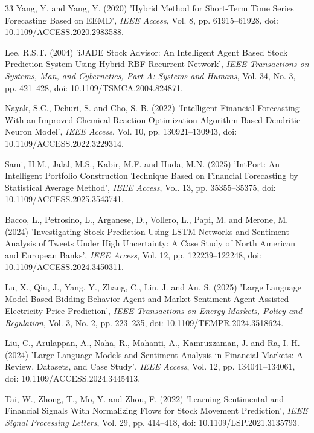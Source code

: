 \documentclass{singlecol-new}
\theoremstyle{TH}{
\newtheorem{lemma}{Lemma}
\newtheorem{theorem}[lemma]{Theorem}
\newtheorem{corrolary}[lemma]{Corrolary}
\newtheorem{conjecture}[lemma]{Conjecture}
\newtheorem{proposition}[lemma]{Proposition}
\newtheorem{claim}[lemma]{Claim}
\newtheorem{stheorem}[lemma]{Wrong Theorem}
\newtheorem{algorithm}{Algorithm}
}
\theoremstyle{THrm}{
\newtheorem{definition}{Definition}[section]
\newtheorem{question}{Question}[section]
\newtheorem{remark}{Remark}
\newtheorem{scheme}{Scheme}
}
\theoremstyle{THhit}{
\newtheorem{case}{Case}[section]
}
\begin{document}
\begin{thebibliography}{33}
Yang, Y. and Yang, Y. (2020) 'Hybrid Method for Short-Term Time Series Forecasting Based on EEMD', {\it IEEE Access}, Vol. 8, pp. 61915--61928, doi: 10.1109/ACCESS.2020.2983588.

Lee, R.S.T. (2004) 'iJADE Stock Advisor: An Intelligent Agent Based Stock Prediction System Using Hybrid RBF Recurrent Network', {\it IEEE Transactions on Systems, Man, and Cybernetics, Part A: Systems and Humans}, Vol. 34, No. 3, pp. 421--428, doi: 10.1109/TSMCA.2004.824871.

Nayak, S.C., Dehuri, S. and Cho, S.-B. (2022) 'Intelligent Financial Forecasting With an Improved Chemical Reaction Optimization Algorithm Based Dendritic Neuron Model', {\it IEEE Access}, Vol. 10, pp. 130921--130943, doi: 10.1109/ACCESS.2022.3229314.

Sami, H.M., Jalal, M.S., Kabir, M.F. and Huda, M.N. (2025) 'IntPort: An Intelligent Portfolio Construction Technique Based on Financial Forecasting by Statistical Average Method', {\it IEEE Access}, Vol. 13, pp. 35355--35375, doi: 10.1109/ACCESS.2025.3543741.

Bacco, L., Petrosino, L., Arganese, D., Vollero, L., Papi, M. and Merone, M. (2024) 'Investigating Stock Prediction Using LSTM Networks and Sentiment Analysis of Tweets Under High Uncertainty: A Case Study of North American and European Banks', {\it IEEE Access}, Vol. 12, pp. 122239--122248, doi: 10.1109/ACCESS.2024.3450311.

Lu, X., Qiu, J., Yang, Y., Zhang, C., Lin, J. and An, S. (2025) 'Large Language Model-Based Bidding Behavior Agent and Market Sentiment Agent-Assisted Electricity Price Prediction', {\it IEEE Transactions on Energy Markets, Policy and Regulation}, Vol. 3, No. 2, pp. 223--235, doi: 10.1109/TEMPR.2024.3518624.

Liu, C., Arulappan, A., Naha, R., Mahanti, A., Kamruzzaman, J. and Ra, I.-H. (2024) 'Large Language Models and Sentiment Analysis in Financial Markets: A Review, Datasets, and Case Study', {\it IEEE Access}, Vol. 12, pp. 134041--134061, doi: 10.1109/ACCESS.2024.3445413.

Tai, W., Zhong, T., Mo, Y. and Zhou, F. (2022) 'Learning Sentimental and Financial Signals With Normalizing Flows for Stock Movement Prediction', {\it IEEE Signal Processing Letters}, Vol. 29, pp. 414--418, doi: 10.1109/LSP.2021.3135793.


\end{thebibliography}
\end{document}
